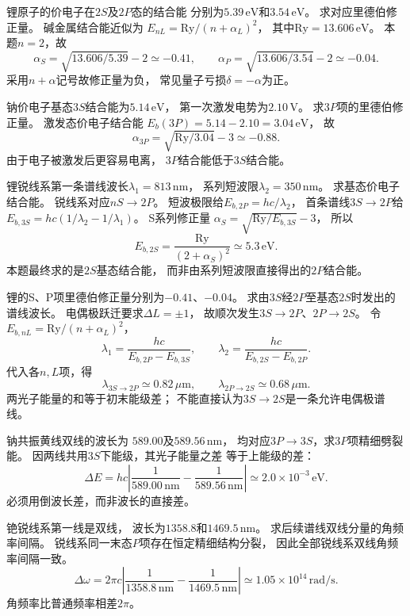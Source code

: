 锂原子的价电子在$2S$及$2P$态的结合能
分别为$5.39\,\mathrm{eV}$和$3.54\,\mathrm{eV}$。
求对应里德伯修正量。
\exsolution
碱金属结合能近似为
$E_{nL}=\mathrm{Ry}/(n+\alpha_L)^2$，
其中$\mathrm{Ry}=13.606\,\mathrm{eV}$。
本题$n=2$，故
\[
 \boxed{\alpha_S=\sqrt{13.606/5.39}-2\simeq-0.41},
 \qquad
 \boxed{\alpha_P=\sqrt{13.606/3.54}-2\simeq-0.04}.
\]
\excheck 采用$n+\alpha$记号故修正量为负，
常见量子亏损$\delta=-\alpha$为正。

钠价电子基态$3S$结合能为$5.14\,\mathrm{eV}$，
第一次激发电势为$2.10\,\mathrm V$。
求$3P$项的里德伯修正量。
\exsolution
激发态价电子结合能
$E_b(3P)=5.14-2.10=3.04\,\mathrm{eV}$，
故
\[
 \boxed{\alpha_{3P}=\sqrt{\mathrm{Ry}/3.04}-3
 \simeq-0.88}.
\]
\excheck 由于电子被激发后更容易电离，
$3P$结合能低于$3S$结合能。

锂锐线系第一条谱线波长$\lambda_1=813\,\mathrm{nm}$，
系列短波限$\lambda_2=350\,\mathrm{nm}$。
求基态价电子结合能。
\exsolution
锐线系对应$nS\to2P$。
短波极限给$E_{b,2P}=hc/\lambda_2$，
首条谱线$3S\to2P$给
$E_{b,3S}=hc(1/\lambda_2-1/\lambda_1)$。
S系列修正量
$\alpha_S=\sqrt{\mathrm{Ry}/E_{b,3S}}-3$，
所以
\[
 \boxed{E_{b,2S}=\frac{\mathrm{Ry}}{(2+\alpha_S)^2}
 \simeq5.3\,\mathrm{eV}}.
\]
\excheck 本题最终求的是$2S$基态结合能，
而非由系列短波限直接得出的$2P$结合能。

锂的S、P项里德伯修正量分别为$-0.41$、$-0.04$。
求由$3S$经$2P$至基态$2S$时发出的谱线波长。
\exsolution
电偶极跃迁要求$\Delta L=\pm1$，
故顺次发生$3S\to2P$、$2P\to2S$。
令$E_{b,nL}=\mathrm{Ry}/(n+\alpha_L)^2$，
\[
 \lambda_1=\frac{hc}{E_{b,2P}-E_{b,3S}},
 \qquad
 \lambda_2=\frac{hc}{E_{b,2S}-E_{b,2P}}.
\]
代入各$n,L$项，得
\[
 \boxed{\lambda_{3S\to2P}\simeq0.82\,\mu\mathrm m},
 \qquad
 \boxed{\lambda_{2P\to2S}\simeq0.68\,\mu\mathrm m}.
\]
\excheck 两光子能量的和等于初末能级差；
不能直接认为$3S\to2S$是一条允许电偶极谱线。

钠共振黄线双线的波长为
$589.00$及$589.56\,\mathrm{nm}$，
均对应$3P\to3S$，求$3P$项精细劈裂能。
\exsolution
因两线共用$3S$下能级，其光子能量之差
等于上能级的差：
\[
 \boxed{\Delta E=hc\left|
 \frac1{589.00\,\mathrm{nm}}-\frac1{589.56\,\mathrm{nm}}
 \right|\simeq2.0\times10^{-3}\,\mathrm{eV}}.
\]
\excheck 必须用倒波长差，而非波长的直接差。

铯锐线系第一线是双线，
波长为$1358.8$和$1469.5\,\mathrm{nm}$。
求后续谱线双线分量的角频率间隔。
\exsolution
锐线系同一末态$P$项存在恒定精细结构分裂，
因此全部锐线系双线角频率间隔一致。
\[
 \boxed{\Delta\omega=
 2\pi c\left|\frac1{1358.8\,\mathrm{nm}}
 -\frac1{1469.5\,\mathrm{nm}}\right|
 \simeq1.05\times10^{14}\,\mathrm{rad/s}}.
\]
\excheck 角频率比普通频率相差$2\pi$。

